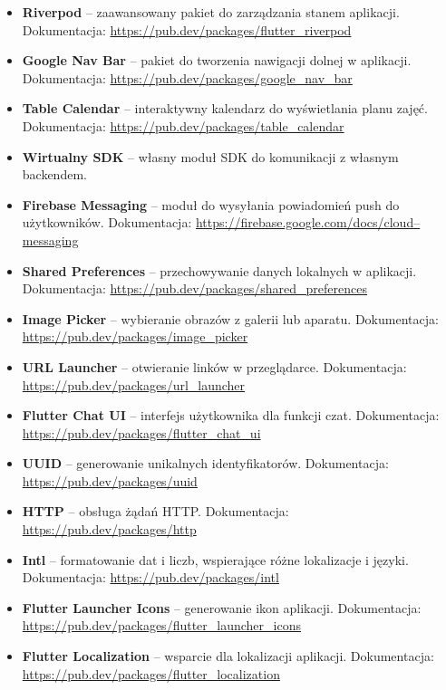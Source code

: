 \begin{itemize}
  \item \textbf{Riverpod} – zaawansowany pakiet do zarządzania stanem aplikacji. Dokumentacja: \url{https://pub.dev/packages/flutter_riverpod}
  \item \textbf{Google Nav Bar} – pakiet do tworzenia nawigacji dolnej w aplikacji. Dokumentacja: \url{https://pub.dev/packages/google_nav_bar}
  \item \textbf{Table Calendar} – interaktywny kalendarz do wyświetlania planu zajęć. Dokumentacja: \url{https://pub.dev/packages/table_calendar}
  \item \textbf{Wirtualny SDK} – własny moduł SDK do komunikacji z własnym backendem.
  \item \textbf{Firebase Messaging} – moduł do wysyłania powiadomień push do użytkowników. Dokumentacja: \url{https://firebase.google.com/docs/cloud–messaging}
  \item \textbf{Shared Preferences} – przechowywanie danych lokalnych w aplikacji. Dokumentacja: \url{https://pub.dev/packages/shared_preferences}
  \item \textbf{Image Picker} – wybieranie obrazów z galerii lub aparatu. Dokumentacja: \url{https://pub.dev/packages/image_picker}
  \item \textbf{URL Launcher} – otwieranie linków w przeglądarce. Dokumentacja: \url{https://pub.dev/packages/url_launcher}
  \item \textbf{Flutter Chat UI} – interfejs użytkownika dla funkcji czat. Dokumentacja: \url{https://pub.dev/packages/flutter_chat_ui}
  \item \textbf{UUID} – generowanie unikalnych identyfikatorów. Dokumentacja: \url{https://pub.dev/packages/uuid}
  \item \textbf{HTTP} – obsługa żądań HTTP. Dokumentacja: \url{https://pub.dev/packages/http}
  \item \textbf{Intl} – formatowanie dat i liczb, wspierające różne lokalizacje i języki. Dokumentacja: \url{https://pub.dev/packages/intl}
  \item \textbf{Flutter Launcher Icons} – generowanie ikon aplikacji. Dokumentacja: \url{https://pub.dev/packages/flutter_launcher_icons}
  \item \textbf{Flutter Localization} – wsparcie dla lokalizacji aplikacji. Dokumentacja: \url{https://pub.dev/packages/flutter_localization}
\end{itemize}
